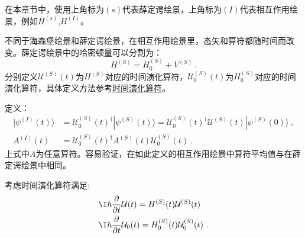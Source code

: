 
在本章节中，使用上角标为$(s)$代表薛定谔绘景，上角标为$(I)$代表相互作用绘景，例如$H^{(s)}$,$H^{(I)}$。

\begin{definition}{}

不同于海森堡绘景和薛定谔绘景，在相互作用绘景里，态矢和算符都随时间而改变。薛定谔绘景中的哈密顿量可以分割为：
\begin{equation}
H^{(S)}=H^{(S)}_0+V^{(S)}~.
\end{equation}
分别定义$\mathcal U^{(S)}(t)$为$H^{(S)}$对应的时间演化算符，$\mathcal U^{(S)}_0(t)$为$H^{(S)}_0$对应的时间演化算符，具体定义方法参考\href{https://wuli.wiki/online/TOprt.html}{时间演化算符}。

定义：
\begin{align}
|\psi^{(I)}(t)\rangle&=\mathcal U^{(S)}_0(t)^\dagger|\psi^{(S)}(t)\rangle=\mathcal U^{(S)}_0(t)^\dagger\mathcal U^{(S)}(t)|\psi^{(S)}(0)\rangle~, \\
A^{(I)}(t)&=\mathcal U^{(S)}_0(t)^\dagger A^{(S)}(t)\mathcal U^{(S)}_0 (t)~.
\end{align}
上式中$A$为任意算符。容易验证，在如此定义的相互作用绘景中算符平均值与在薛定谔绘景中相同。

\end{definition}

考虑时间演化算符满足:
\begin{align}
&\I\hbar\frac{\partial}{\partial t}\mathcal{U}(t) = H^{(S)}(t)\mathcal{U}^{(S)}(t) \\
&\I\hbar\frac{\partial}{\partial t}\mathcal{U}_0(t) = H^{(S)}_0(t)\mathcal{U}_0^{(S)}(t)~.
\end{align}

